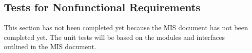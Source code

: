 \documentclass[12pt, titlepage]{article}
\begin{document}



					
					
					


					

					
					
					



    



\subsection{Tests for Nonfunctional Requirements}

This section has not been completed yet because the MIS document has not been
completed yet. The unit tests will be based on the modules and interfaces
outlined in the MIS document.
\end{document}
